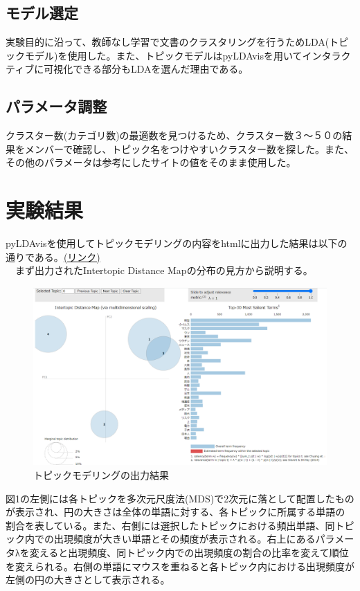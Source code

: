 \documentclass[a4paper, 11pt, titlepage]{jsarticle}
\begin{document}
\subsection{モデル選定}
実験目的に沿って、教師なし学習で文書のクラスタリングを行うためLDA(トピックモデル)を使用した。また、トピックモデルはpyLDAvisを用いてインタラクティブに可視化できる部分もLDAを選んだ理由である。 

\subsection{パラメータ調整}
クラスター数(カテゴリ数)の最適数を見つけるため、クラスター数３〜５０の結果をメンバーで確認し、トピック名をつけやすいクラスター数を探した。また、その他のパラメータは参考にしたサイトの値をそのまま使用した\cite{LDA}。

\section{実験結果}
pyLDAvisを使用してトピックモデリングの内容をhtmlに出力した結果は以下の通りである。\href{https://ie.u-ryukyu.ac.jp/~e205759/pyldavis_output.html}{(リンク)}\\
　まず出力されたIntertopic Distance Mapの分布の見方から説明する。\\
\begin{figure}[H]
  \centering 
  \includegraphics[scale=0.25]{picture1.png}
  \caption{トピックモデリングの出力結果}
\end{figure}
図1の左側には各トピックを多次元尺度法(MDS)で2次元に落として配置したものが表示され、円の大きさは全体の単語に対する、各トピックに所属する単語の割合を表している。また、右側には選択したトピックにおける頻出単語、同トピック内での出現頻度が大きい単語とその頻度が表示される。右上にあるパラメータλを変えると出現頻度、同トピック内での出現頻度の割合の比率を変えて順位を変えられる。右側の単語にマウスを重ねると各トピック内における出現頻度が左側の円の大きさとして表示される。\\
\end{document}
